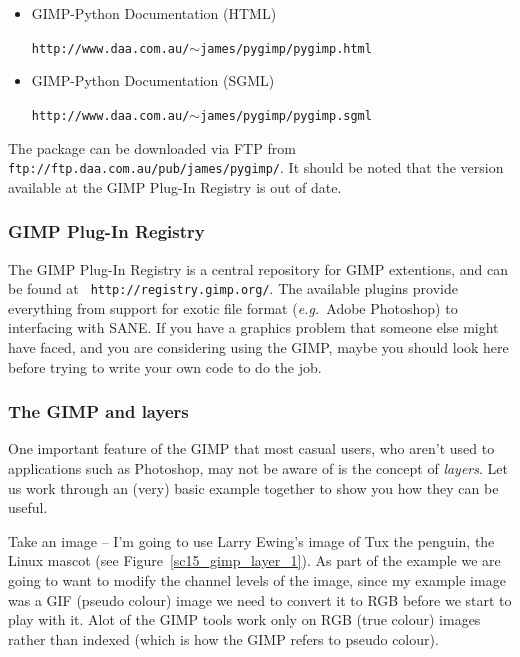 \documentclass[twoside,11pt]{article}
\newcommand{\htmladdnormallink}[2]{#1}
\newcommand{\htmlref}[2]{#1}
\newcommand{\latex}[1]{#1}
\begin{document}
\begin{itemize}
\item {GIMP-Python Documentation (HTML)}\\
\begin{small}\htmladdnormallink{{\tt http://www.daa.com.au/$\sim$james/pygimp/pygimp.html}}{http://www.daa.com.au/~james/pygimp/pygimp.html}\end{small}
\item {GIMP-Python Documentation (SGML)}\\
\begin{small}\htmladdnormallink{{\tt http://www.daa.com.au/$\sim$james/pygimp/pygimp.sgml}}{http://www.daa.com.au/~james/pygimp/pygimp.sgml}\end{small}
\end{itemize}

The package can be downloaded via FTP from \htmladdnormallink{{\tt
ftp://ftp.daa.com.au/pub/james/pygimp/}}{ftp://ftp.daa.com.au/pub/james/pygimp/}.
It should be noted that the version available at the GIMP Plug-In
Registry is out of date.

\subsubsection{GIMP Plug-In Registry}

The GIMP \htmladdnormallink{Plug-In
Registry}{http://registry.gimp.org/} is a central repository for GIMP
extentions\latex{, and can be found at {\tt
http://registry.gimp.org/}}. The available plugins provide everything
from support for exotic file format ({\em e.g.\ }Adobe Photoshop) to
interfacing with \htmlref{SANE}{sc15_scanners}. If you have a graphics
problem that someone else might have faced, and you are considering
using the GIMP, maybe you should look here before trying to write your
own code to do the job.

\subsubsection{The GIMP and layers}

One important feature of the GIMP that most casual users, who aren't
used to applications such as Photoshop, may not be aware of is the
concept of {\em layers}. Let us work through an (very) basic example
together to show you how they can be useful.

Take an image -- I'm going to use Larry Ewing's image of
\htmladdnormallink{Tux the
penguin}{http://www.woodsoup.org/projs/tux_aqfh/doc/index.html}, the
Linux mascot (see Figure~\ref{sc15_gimp_layer_1}). As part of the
example we are going to want to modify the channel levels of the
image, since my example image was a GIF (pseudo colour) image we need
to convert it to RGB before we start to play with it. Alot of the GIMP
tools work only on RGB (true colour) images rather than indexed (which
is how the GIMP refers to \htmlref{pseudo colour}{sc15_pseudo}). 
\end{document}
